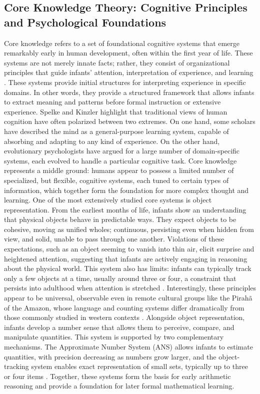 \documentclass[12pt,a4paper]{report}
\begin{document}
\subsection{Core Knowledge Theory: Cognitive Principles and Psychological Foundations}
Core knowledge refers to a set of foundational cognitive systems that emerge remarkably early in human development, often within the first year of life. These systems are not merely innate facts; rather, they consist of organizational principles that guide infants' attention, interpretation of experience, and learning \cite{chiave10}. These systems provide initial structures for interpreting experience in specific domains. In other words, they provide a structured framework that allows infants to extract meaning and patterns before formal instruction or extensive experience.
Spelke and Kinzler highlight that traditional views of human cognition have often polarized between two extremes. On one hand, some scholars have described the mind as a general-purpose learning system, capable of absorbing and adapting to any kind of experience. On the other hand, evolutionary psychologists have argued for a large number of domain-specific systems, each evolved to handle a particular cognitive task. 
Core knowledge represents a middle ground: humans appear to possess a limited number of specialized, but flexible, cognitive systems, each tuned to certain types of information, which together form the foundation for more complex thought and learning.
One of the most extensively studied core systems is object representation. From the earliest months of life, infants show an understanding that physical objects behave in predictable ways. They expect objects to be cohesive, moving as unified wholes; continuous, persisting even when hidden from view, and solid, unable to pass through one another. Violations of these expectations, such as an object seeming to vanish into thin air, elicit surprise and heightened attention, suggesting that infants are actively engaging in reasoning about the physical world. This system also has limits: infants can typically track only a few objects at a time, usually around three or four, a constraint that persists into adulthood when attention is stretched \cite{chiave33}. Interestingly, these principles appear to be universal, observable even in remote cultural groups like the Pirahã of the Amazon, whose language and counting systems differ dramatically from those commonly studied in western contexts \cite{chiave32}.
Alongside object representation, infants develop a number sense that allows them to perceive, compare, and manipulate quantities. This system is supported by two complementary mechanisms. The Approximate Number System (ANS) allows infants to estimate quantities, with precision decreasing as numbers grow larger, and the object-tracking system enables exact representation of small sets, typically up to three or four items \cite{chiave33}. Together, these systems form the basis for early arithmetic reasoning and provide a foundation for later formal mathematical learning.
\end{document}
